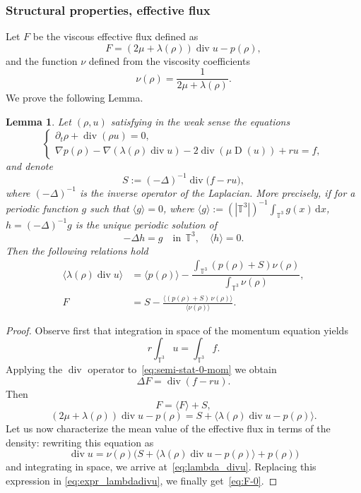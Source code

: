 \documentclass[JEP,XML,SOM,Unicode,NoEqCountersInSection]{cedram}
\newcommand{\<}{\bigl\langle}
\renewcommand{\>}{\bigr\rangle}
\newcommand{\labeleq}[1]{}
\newenvironment{subnumcasess}{\begin{equation*}\begin{cases}}{\end{cases}\end{equation*}}
\newtheorem{lem}[thm]{Lemma}
\theoremstyle{definition}
\theoremstyle{remark}
\newcommand{\TT}{\mathbb{T}^3}
\DeclareMathOperator{\Div}{div}
\newcommand{\di}{\,\mathrm{d}}
\DeclareMathOperator{\D}{D}
\begin{document}
\subsubsection*{Structural properties, effective flux}
Let $F$ be the viscous effective flux defined as
\begin{equation*}\labeleq{df:eff_flux}
F = (2\mu + \lambda(\rho))\Div u - p(\rho),
\end{equation*}
and the function $\nu$ defined from the viscosity coefficients
\begin{equation}\label{df:nu}
\nu(\rho) = \dfrac{1}{2\mu + \lambda(\rho)}.
\end{equation}
We prove the following Lemma.
\begin{lem}
Let $(\rho,u)$ satisfying in the weak sense the equations
\begin{subnumcasess}{\labeleq{sys-0}}
\partial_t \rho + \Div (\rho u) = 0, \\
\nabla p(\rho) - \nabla(\lambda(\rho) \Div u) - 2\Div(\mu \D(u)) + ru = f,
\end{subnumcasess}%
and denote
\[
S:= (-\Delta)^{-1}\Div \big(f -r u\big),
\]
where $(-\Delta)^{-1}$ is the inverse operator of the Laplacian.
More precisely, if for a periodic function $g$ such that $\<g\> =0$, where $\<g\>:= (|\TT|)^{-1} \int_{\TT}{g(x) \di x}$, $h=(-\Delta)^{-1}g$ is the unique periodic solution of
\[
-\Delta h = g\quad \text{in}~~ \TT, \quad \<h\> = 0.
\]
Then the following relations hold
\begin{align} \label{eq:lambda_divu}
\<\lambda(\rho)\Div u\> &= \<p(\rho)\> - \dfrac{\int_{\TT}{(p(\rho)+ S)\nu(\rho)}}{\int_{\TT}{\nu(\rho)}},\\
\label{eq:F-0}
F&= S - \frac{\<(p(\rho) +S)\, \nu(\rho)\>}{\<\nu(\rho)\>}.
\end{align}
\end{lem}

\begin{proof}
Observe first that integration in space of the momentum equation yields
\begin{equation*}\labeleq{int-f-u}
r \int_{\TT}{u} = \int_{\TT}{f}.
\end{equation*}
Applying the $\Div$ operator to~\eqref{eq:semi-stat-0-mom} we obtain
\begin{equation*}
\Delta F = \Div (f-ru).
\end{equation*}
Then
\begin{equation*}
F = \<F\> + S,
\end{equation*}
\ie
\begin{equation}\label{eq:expr_lambdadivu}
(2\mu+ \lambda(\rho)) \Div u - p(\rho) = S + \< \lambda(\rho) \Div u - p(\rho) \>.
\end{equation}
Let us now characterize the mean value of the effective flux in terms of
the density: rewriting this equation as
\begin{equation*}
\Div u = \nu(\rho)\bigl(S + \<\lambda(\rho)\Div u- p(\rho) \> + p(\rho) \bigr)
\end{equation*}
and integrating in space, we arrive at~\eqref{eq:lambda_divu}.
Replacing this expression in \eqref{eq:expr_lambdadivu}, we finally get~\eqref{eq:F-0}.
\end{proof}
\end{document}
